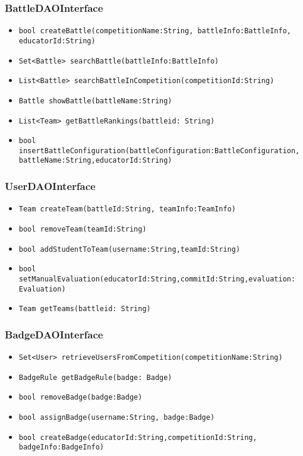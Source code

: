 \subsubsection{BattleDAOInterface}
\begin{itemize}
    \item \texttt{bool createBattle(competitionName:String, battleInfo:BattleInfo,\\educatorId:String)}%
    \item \texttt{Set<Battle> searchBattle(battleInfo:BattleInfo)}
    \item \texttt{List<Battle> searchBattleInCompetition(competitionId:String)}%
    \item \texttt{Battle showBattle(battleName:String)}
    \item \texttt{List<Team> getBattleRankings(battleid: String)}
    \item \texttt{bool insertBattleConfiguration(battleConfiguration:BattleConfiguration,\\battleName:String,educatorId:String)}%
\end{itemize}

\subsubsection{UserDAOInterface}
\begin{itemize}
    \item \texttt{Team createTeam(battleId:String, teamInfo:TeamInfo)}%
    \item \texttt{bool removeTeam(teamId:String)}
    \item \texttt{bool addStudentToTeam(username:String,teamId:String)}%
    \item \texttt{bool setManualEvaluation(educatorId:String,commitId:String,evaluation: Evaluation)}%
    \item \texttt{Team getTeams(battleid: String)}%
\end{itemize}

\subsubsection{BadgeDAOInterface}
\begin{itemize}
    \item \texttt{Set<User> retrieveUsersFromCompetition(competitionName:String)}
    \item \texttt{BadgeRule getBadgeRule(badge: Badge)}
    \item \texttt{bool removeBadge(badge:Badge)}
    \item \texttt{bool assignBadge(username:String, badge:Badge)}
    \item \texttt{bool createBadge(educatorId:String,competitionId:String, badgeInfo:BadgeInfo)}%
\end{itemize}

